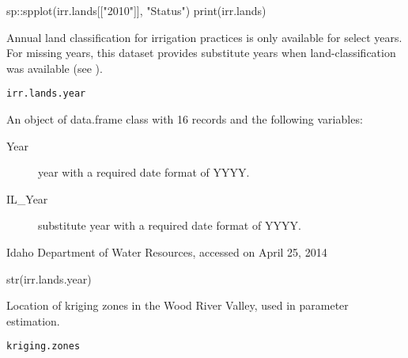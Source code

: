 \documentclass[a4paper]{book}
\begin{document}
%
\begin{Examples}
\begin{ExampleCode}
sp::spplot(irr.lands[["2010"]], "Status")
print(irr.lands)

\end{ExampleCode}
\end{Examples}
%
\begin{Description}\relax
Annual land classification for irrigation practices is only available for select years.
For missing years, this dataset provides substitute years when land-classification was
available (see ).
\end{Description}
%
\begin{Usage}
\begin{verbatim}
irr.lands.year
\end{verbatim}
\end{Usage}
%
\begin{Format}
An object of data.frame class with 16 records and the following variables:
\begin{description}

\item[Year] year with a required date format of YYYY.
\item[IL\_Year] substitute year with a required date format of YYYY.

\end{description}

\end{Format}
%
\begin{Source}\relax
Idaho Department of Water Resources, accessed on April 25, 2014
\end{Source}
%
\begin{Examples}
\begin{ExampleCode}
str(irr.lands.year)

\end{ExampleCode}
\end{Examples}
%
\begin{Description}\relax
Location of kriging zones in the Wood River Valley, used in parameter estimation.
\end{Description}
%
\begin{Usage}
\begin{verbatim}
kriging.zones
\end{verbatim}
\end{Usage}
\end{document}
